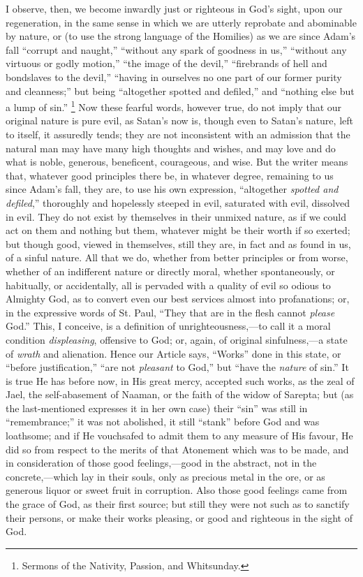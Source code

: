 I observe, then, we become inwardly just or righteous in God's
sight, upon our regeneration, in the same sense in which we are
utterly reprobate and abominable by nature, or (to use the strong
language of the Homilies) as we are since Adam's fall ``corrupt
and naught,'' ``without any spark of goodness in us,''
``without any virtuous or godly motion,'' ``the image of
the devil,'' ``firebrands of hell and bondslaves to the
devil,'' ``having in ourselves no one part of our former
purity and cleanness;'' but being ``altogether spotted and
defiled,'' and ``nothing else but a lump of sin.'' \footnote{Sermons of the Nativity, Passion, and Whitsunday.} Now these fearful words, however true, do not imply that our
original nature is pure evil, as Satan's now is, though even to
Satan's nature, left to itself, it assuredly tends; they are not
inconsistent with an admission that the natural man may have many high
thoughts and wishes, and may love and do what is noble, generous,
beneficent, courageous, and wise. But the writer means that, whatever
good principles there be, in whatever degree, remaining to us since
Adam's fall, they are, to use his own expression, ``altogether \emph{spotted
and defiled},'' thoroughly and hopelessly steeped in evil,
saturated with evil, dissolved in evil. They do not exist by
themselves in their unmixed nature, as if we could act on them and
nothing but them, whatever might be their worth if so exerted; but
though good, viewed in themselves, still they are, in fact and as
found in us, of a sinful nature. All that we do, whether from better
principles or from worse, whether of an indifferent nature or directly
moral, whether spontaneously, or habitually, or accidentally, all is
pervaded with a quality of evil so odious to Almighty God, as to
convert even our best services almost into profanations; or, in the
expressive words of St. Paul, ``They that are in the flesh cannot \emph{please}
God.'' This, I conceive, is a definition of unrighteousness,—to
call it a moral condition \emph{displeasing}, offensive to God; or,
again, of original sinfulness,—a state of \emph{wrath} and
alienation. Hence our Article says, ``Works'' done in this
state, or ``before justification,'' ``are not \emph{pleasant}
to God,'' but ``have the \emph{nature} of sin.'' It is
true He has before now, in His great mercy, accepted such works, as
the zeal of Jael, the self-abasement of Naaman, or the faith of the
widow of Sarepta; but (as the last-mentioned expresses it in her own
case) their ``sin'' was still in ``remembrance;'' it
was not abolished, it still ``stank'' before God and was
loathsome; and if He vouchsafed to admit them to any measure of His
favour, He did so from respect to the merits of that Atonement which
was to be made, and in consideration of those good feelings,—good in
the abstract, not in the concrete,—which lay in their souls, only as
precious metal in the ore, or as generous liquor or sweet fruit in
corruption. Also those good feelings came from the grace of God, as
their first source; but still they were not such as to sanctify their
persons, or make their works pleasing, or good and righteous in the
sight of God.

